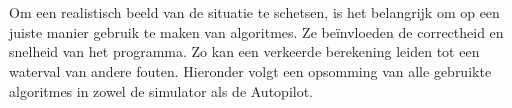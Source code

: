 
\\
\\
Om een realistisch beeld van de situatie te schetsen, is het belangrijk om op een juiste manier gebruik te maken van algoritmes. Ze be\"invloeden de correctheid en snelheid van het programma. Zo kan een verkeerde berekening leiden tot een waterval van andere fouten. Hieronder volgt een opsomming van alle gebruikte algoritmes in zowel de simulator als de Autopilot.
